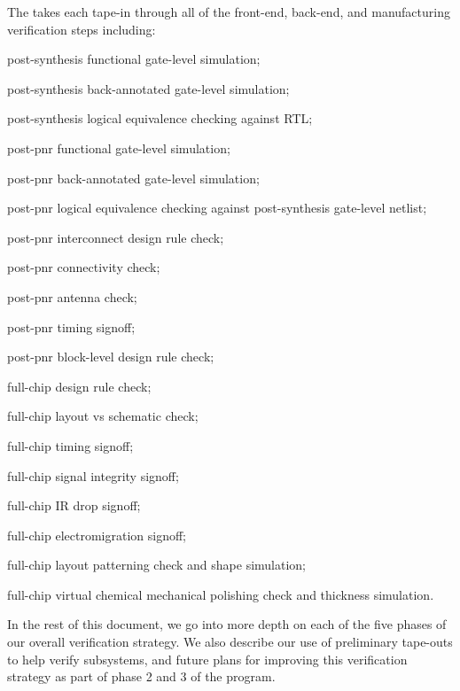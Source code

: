 \begin{cbxlist}{1.5em}{1em}{1em}
 \item The  takes each
    tape-in through all of the front-end, back-end, and manufacturing
    verification steps including:

    \smallskip
    \begin{cbxlist}[--]{1.5em}{0em}{0em}
      \raggedright

      \item post-synthesis functional gate-level simulation;
      \item post-synthesis back-annotated gate-level simulation;
      \item post-synthesis logical equivalence checking against RTL;
      \item post-pnr functional gate-level simulation;
      \item post-pnr back-annotated gate-level simulation;
      \item post-pnr logical equivalence checking against post-synthesis
         gate-level netlist;
      \item post-pnr interconnect design rule check;
      \item post-pnr connectivity check;
      \item post-pnr antenna check;
      \item post-pnr timing signoff;
      \item post-pnr block-level design rule check;
      \item full-chip design rule check;
      \item full-chip layout vs schematic check;
      \item full-chip timing signoff;
      \item full-chip signal integrity signoff;
      \item full-chip IR drop signoff;
      \item full-chip electromigration signoff;
      \item full-chip layout patterning check and shape simulation;
      \item full-chip virtual chemical mechanical polishing check and
         thickness simulation.

    \end{cbxlist}

\end{cbxlist}

\medskip\noindent
In the rest of this document, we go into more depth on each of the
five phases of our overall verification strategy. We also describe our
use of preliminary tape-outs to help verify subsystems, and future plans
for improving this verification strategy as part of phase 2 and 3 of the
program.
